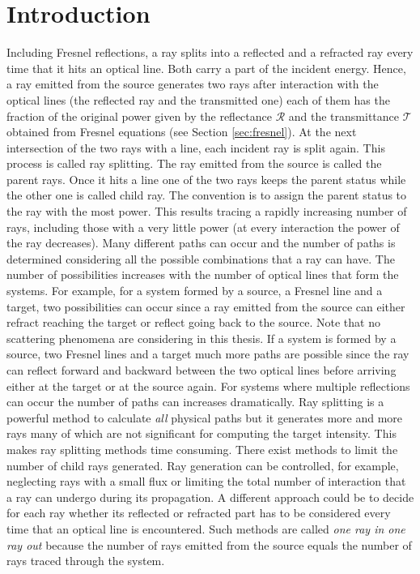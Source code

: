 \section{Introduction}
Including Fresnel reflections, a ray splits into a reflected and a refracted ray every time that it hits an optical line. Both carry a part of the incident energy.
Hence, a ray emitted from the source generates two rays after interaction with the optical lines (the reflected ray and the transmitted one) each of them has the fraction of the original power given by the reflectance $\mathcal{R}$ and the transmittance $\mathcal{T}$ obtained from Fresnel equations (see Section \ref{sec:fresnel}).
At the next intersection of the two rays with a line, each incident ray is split
again. This process is called ray splitting. The ray emitted from the source is called the parent rays. Once it hits a line one of the two rays keeps the parent status while the other one is called child ray. The convention is to assign the parent status to the ray with the most power.
This results tracing a rapidly increasing number of rays, including those with a very little power (at every interaction the power of the ray decreases). 
Many different paths can occur and the number of paths is determined considering all the possible combinations that a ray can have. The number of possibilities increases with the number of optical lines that form the systems. For example, for a system formed by a source, a Fresnel line and a target, two possibilities can occur since a ray emitted from the source can either refract reaching the target or reflect going back to the source. Note that no scattering phenomena are considering in this thesis. If a system is formed by a source, two Fresnel lines and a target much more paths are possible since the ray can reflect forward and backward between the two optical lines before arriving either at the target or at the source again. For systems where multiple reflections can occur the number of paths can increases dramatically. 
Ray splitting is a powerful method to calculate \textit{all} physical paths but it generates more and more rays many of which are not significant for computing the target intensity. This makes ray splitting methods time consuming. 
There exist methods to limit the number of child rays generated. Ray generation can be controlled, for example, neglecting rays with a small flux or limiting the total number of interaction that a ray can undergo during its propagation. A different approach could be to decide for each ray whether its reflected or refracted part has to be considered every time that an optical line is encountered. Such methods are called \textit{one ray in one ray out} because the number of rays emitted from the source equals the number of rays traced through the system.\\ \indent
